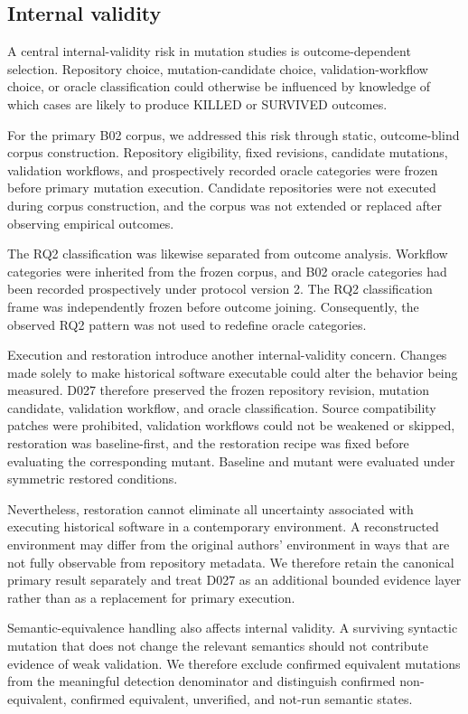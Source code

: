 \subsection{Internal validity}
\label{sec:threats-internal}

A central internal-validity risk in mutation studies is outcome-dependent
selection. Repository choice, mutation-candidate choice, validation-workflow
choice, or oracle classification could otherwise be influenced by knowledge of
which cases are likely to produce KILLED or SURVIVED outcomes.

For the primary B02 corpus, we addressed this risk through static,
outcome-blind corpus construction. Repository eligibility, fixed revisions,
candidate mutations, validation workflows, and prospectively recorded oracle
categories were frozen before primary mutation execution. Candidate
repositories were not executed during corpus construction, and the corpus was
not extended or replaced after observing empirical outcomes.

The RQ2 classification was likewise separated from outcome analysis. Workflow
categories were inherited from the frozen corpus, and B02 oracle categories had
been recorded prospectively under protocol version 2. The RQ2 classification
frame was independently frozen before outcome joining. Consequently, the
observed RQ2 pattern was not used to redefine oracle categories.

Execution and restoration introduce another internal-validity concern. Changes
made solely to make historical software executable could alter the behavior
being measured. D027 therefore preserved the frozen repository revision,
mutation candidate, validation workflow, and oracle classification. Source
compatibility patches were prohibited, validation workflows could not be
weakened or skipped, restoration was baseline-first, and the restoration recipe
was fixed before evaluating the corresponding mutant. Baseline and mutant were
evaluated under symmetric restored conditions.

Nevertheless, restoration cannot eliminate all uncertainty associated with
executing historical software in a contemporary environment. A reconstructed
environment may differ from the original authors' environment in ways that are
not fully observable from repository metadata. We therefore retain the
canonical primary result separately and treat D027 as an additional bounded
evidence layer rather than as a replacement for primary execution.

Semantic-equivalence handling also affects internal validity. A surviving
syntactic mutation that does not change the relevant semantics should not
contribute evidence of weak validation. We therefore exclude confirmed
equivalent mutations from the meaningful detection denominator and distinguish
confirmed non-equivalent, confirmed equivalent, unverified, and not-run
semantic states.


